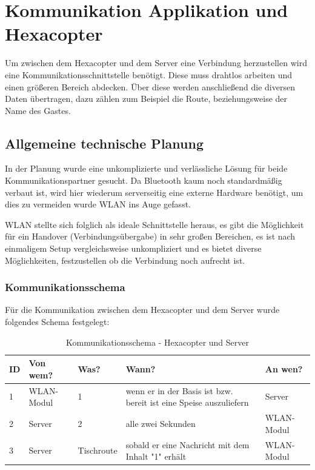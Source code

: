 \chapter{Kommunikation Applikation und Hexacopter}
\renewcommand{\kapitelautor}{Autor: Katharina Joksch, Lucas Ullrich}
Um zwischen dem Hexacopter und dem Server eine Verbindung herzustellen wird eine Kommunikationsschnittstelle benötigt. Diese muss drahtlos arbeiten und einen größeren Bereich
abdecken. Über diese werden anschließend die diversen Daten übertragen, dazu zählen zum Beispiel die Route, beziehungsweise der Name des Gastes.

\section{Allgemeine technische Planung}
In der Planung wurde eine unkomplizierte und verlässliche Lösung für beide Kommunikationspartner gesucht. Da Bluetooth kaum noch standardmäßig verbaut ist, wird hier wiederum
serverseitig eine externe Hardware benötigt, um dies zu vermeiden wurde WLAN ins Auge gefasst.

WLAN stellte sich folglich als ideale Schnittstelle heraus,
es gibt die Möglichkeit für ein Handover (Verbindungsübergabe) in sehr großen Bereichen, es ist nach einmaligem Setup vergleichsweise unkompliziert und es bietet diverse
Möglichkeiten, festzustellen ob die Verbindung noch aufrecht ist.

      \subsection{Kommunikationsschema}
Für die Kommunikation zwischen dem Hexacopter und dem Server wurde folgendes Schema festgelegt:
\begin{table}[H]
\centering
\begin{tabular}{|p{0.5cm}|p{2cm}|p{2cm}|p{5.5cm}|p{2cm}|}
\hline \textbf{ID} & \textbf{Von wem?} & \textbf{Was?} & \textbf{Wann?} & \textbf{An wen?} \\\hline
\hline 1 & WLAN-Modul & 1 & wenn er in der Basis ist bzw. \newline bereit ist eine Speise auszuliefern & Server \\\hline
\hline 2 & Server & 2 & alle zwei Sekunden & WLAN-Modul \\\hline
\hline 3 & Server & Tischroute & sobald er eine Nachricht mit dem Inhalt "1" erhält & WLAN-Modul \\\hline
\end{tabular}
\caption{Kommunikationsschema - Hexacopter und Server}
\end{table}

